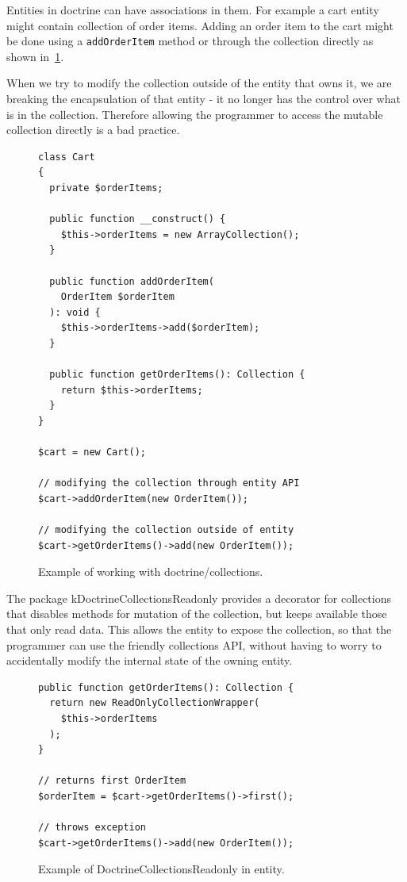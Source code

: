  \label{sec:state:doctrine-collections-readonly}

Entities in \gls{doctrine} can have associations in them. For example a cart entity might contain collection of order items. Adding an order item to the cart might be done using a \lstinline{addOrderItem} method or through the collection directly as shown in~\ref{fig:collections-readonly:example}.

When we try to modify the collection outside of the entity that owns it, we are breaking the encapsulation of that entity - it no longer has the control over what is in the collection. Therefore allowing the programmer to access the mutable collection directly is a bad practice.

\begin{figure} \label{fig:collections-readonly:example}
\begin{lstlisting}
class Cart
{
  private $orderItems;

  public function __construct() {
    $this->orderItems = new ArrayCollection();
  }

  public function addOrderItem(
    OrderItem $orderItem
  ): void {
    $this->orderItems->add($orderItem);
  }

  public function getOrderItems(): Collection {
    return $this->orderItems;
  }
}

$cart = new Cart();

// modifying the collection through entity API
$cart->addOrderItem(new OrderItem());

// modifying the collection outside of entity
$cart->getOrderItems()->add(new OrderItem());
\end{lstlisting}
\caption{Example of working with doctrine/collections.}
\end{figure}

The package \gls{kDoctrineCollectionsReadonly} provides a decorator for collections that disables methods for mutation of the collection, but keeps available those that only read data. This allows the entity to expose the collection, so that the programmer can use the friendly collections API, without having to worry to accidentally modify the internal state of the owning entity.

\begin{figure} \label{fig:collections-readonly:readonly}
\begin{lstlisting}
public function getOrderItems(): Collection {
  return new ReadOnlyCollectionWrapper(
    $this->orderItems
  );
}

// returns first OrderItem
$orderItem = $cart->getOrderItems()->first();

// throws exception
$cart->getOrderItems()->add(new OrderItem());
\end{lstlisting}
\caption{Example of DoctrineCollectionsReadonly in entity.}
\end{figure}

